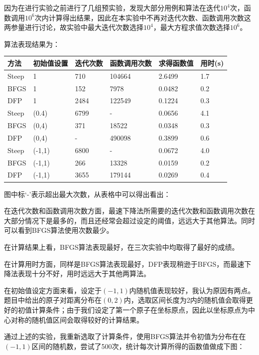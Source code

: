 \documentclass{article}
\begin{document}
因为在进行实验之前进行了几组预实验，发现大部分用例和算法在迭代$10^4$次，函数调用$10^6$次内计算得出结果，因此在本实验中不再对迭代次数、函数调用次数这两参量进行讨论，故实验中最大迭代次数选择$10^4$，最大方程求值次数选择$10^6$。

算法表现结果为：
\begin{table}[H]
\centering
\begin{tabular}{|l|l|l|l|l|l|}
\hline
方法    & 初始值设置    & 迭代次数 & 函数调用次数 & 求得函数值  & 用时(s)   \\ \hline
Steep & 1      & 710    & 104664   & 2.6499 & 1.7 \\ \hline
BFGS  & 1      & 152    & 7978     & 0.0482 & 0.2  \\ \hline
DFP   & 1      & 2484   & 122549   & 0.1224 & 0.3  \\ \hline
Steep & (0.4)  & 6799   & -        & 0.0656 & 4.1  \\ \hline
BFGS  & (0,4)  & 371    & 18522    & 0.0348 & 0.3  \\ \hline
DFP   & (0,4)  & -      & 490098   & 0.3899 & 0.6  \\ \hline
Steep & (-1,1) & 6800   & -        & 0.0672 & 4.0  \\ \hline
BFGS  & (-1,1) & 266    & 13328    & 0.0159 & 0.2  \\ \hline
DFP   & (-1,1) & 3655   & 179144   & 0.0269 & 0.4  \\ \hline
\end{tabular}
\end{table}
图中标‘-’表示超出最大次数，从表格中可以得出看出：

在迭代次数和函数调用次数方面，最速下降法所需要的迭代次数和函数调用次数在大部分情况下是最多的，而且还经常会超过设定的阈值，远远大于其他算法。同时可以看到BFGS算法使用次数最少。

在计算结果上看，BFGS算法表现最好，在三次实验中均取得了最好的成绩。

在计算用时方面，同样是BFGS算法表现最好，DFP表现稍逊于BFGS，而最速下降法表现十分不好，用时远远大于其他两算法。

在初始值设定方面来看，设定于$(-1,1)$内随机值表现较好，我认为原因有两点。题目中给出的原子对距离分布在$(0,2)$内，选取区间长度为2内的随机值会取得更好的初值计算条件；由于我们设定了第一个原子在坐标原点，因此以坐标原点为中心对称的随机值区间会取得较好的计算结果。

通过上述的实验，我重新选取了计算条件，使用BFGS算法并令初值为分布在在$(-1,1)$区间的随机数，尝试了500次，统计每次计算所得的函数值做成下图：
\end{document}

